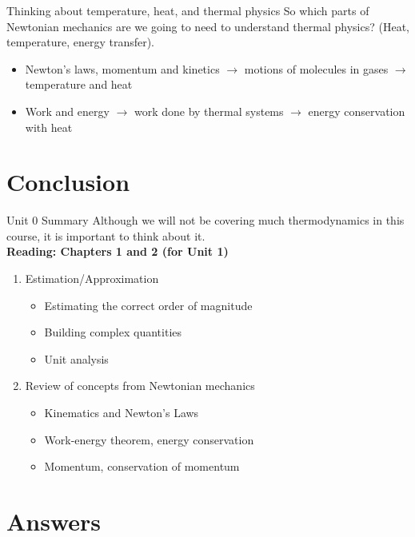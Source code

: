 \documentclass{beamer}
\begin{document}
\begin{frame}{Thinking about temperature, heat, and thermal physics}
So which parts of Newtonian mechanics are we going to need to understand thermal physics? (Heat, temperature, energy transfer).
\begin{itemize}
\item Newton's laws, momentum and kinetics $\rightarrow$ motions of molecules in gases $\rightarrow$ temperature and heat
\item Work and energy $\rightarrow$ work done by thermal systems $\rightarrow$ energy conservation with heat
\end{itemize}
\end{frame}

\section{Conclusion}

\begin{frame}{Unit 0 Summary}
Although we will not be covering much \alert{thermodynamics} in this course, it is important to think about it. \\
\textbf{Reading: Chapters 1 and 2 (for Unit 1)}
\begin{enumerate}
\item Estimation/Approximation
\begin{itemize}
\item \alert{Estimating} the correct order of magnitude
\item \alert{Building} complex quantities
\item \alert{Unit analysis}
\end{itemize}
\item Review of concepts from Newtonian mechanics
\begin{itemize}
\item Kinematics and \alert{Newton's Laws}
\item Work-energy theorem, energy conservation
\item Momentum, conservation of momentum
\end{itemize}
\end{enumerate}
\end{frame}

\section{Answers}
\end{document}
